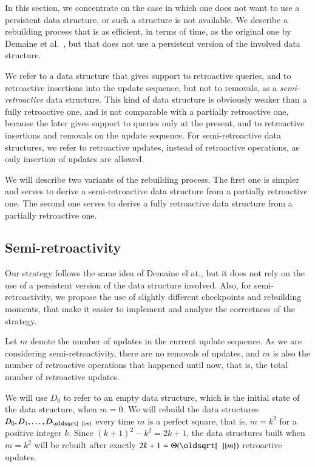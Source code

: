 \documentclass[3p,times,procedia]{elsarticle}
\renewcommand{\sqrt}[2][\mkern8mu]{\mkern-1mu\mathop{\oldsqrt[#1]{#2}}}
\begin{document}
In this section, we concentrate on the case in which one does not want to use a persistent data structure, 
or such a structure is not available.  We describe a rebuilding process that is as efficient, in terms of 
time, as the original one by Demaine et al.~\cite{DemaineIL2007}, but that does not use a persistent 
version of the involved data structure.  

We refer to a data structure that gives support to retroactive queries, and to retroactive insertions 
into the update sequence, but not to removals, as a \emph{semi-retroactive} data structure.
This kind of data structure is obviously weaker than a fully retroactive one, and
is not comparable with a partially retroactive one, because the later gives support 
to queries only at the present, and to retroactive insertions and removals on the 
update sequence.  For semi-retroactive data structures, we refer to retroactive 
updates, instead of retroactive operations, as only insertion of updates are allowed. 

We will describe two variants of the rebuilding process. The first one is simpler and 
serves to derive a semi-retroactive data structure from a partially retroactive one.  
The second one serves to derive a fully retroactive data structure from a partially retroactive one. 

\subsection{Semi-retroactivity}\label{subsec:semi}

Our strategy follows the same idea of Demaine el at., but it does not 
rely on the use of a persistent version of the data structure involved. 
Also, for semi-retroactivity, we propose the use of slightly different 
checkpoints and rebuilding moments, that make it easier to implement 
and analyze the correctness of the strategy. 

Let $m$ denote the number of updates in the current update sequence. 
As we are considering semi-retroactivity, there are no removals of updates, 
and $m$ is also the number of retroactive operations that happened until now, 
that is, the total number of retroactive updates. 

We will use $D_0$ to refer to an empty data structure, 
which is the initial state of the data structure, when $m=0$. 
We will rebuild the data structures $D_0,D_1,\ldots,D_{\sqrt{m}}$ every 
time $m$ is a perfect square, that is, $m=k^2$ for a positive integer $k$.
Since $(k+1)^2-k^2 = 2k+1$, the data structures built 
when $m=k^2$ will be rebuilt after exactly $2k+1=\Theta(\sqrt{m})$ retroactive updates.
\end{document}
